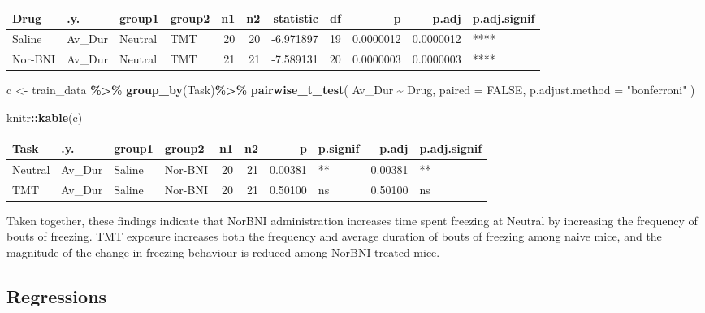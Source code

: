 \documentclass[
]{book}
\newenvironment{Shaded}{\begin{snugshade}}{\end{snugshade}}
\newcommand{\AttributeTok}[1]{\textcolor[rgb]{0.13,0.29,0.53}{#1}}
\newcommand{\ConstantTok}[1]{\textcolor[rgb]{0.56,0.35,0.01}{#1}}
\newcommand{\FunctionTok}[1]{\textcolor[rgb]{0.13,0.29,0.53}{\textbf{#1}}}
\newcommand{\NormalTok}[1]{#1}
\newcommand{\OtherTok}[1]{\textcolor[rgb]{0.56,0.35,0.01}{#1}}
\newcommand{\SpecialCharTok}[1]{\textcolor[rgb]{0.81,0.36,0.00}{\textbf{#1}}}
\newcommand{\StringTok}[1]{\textcolor[rgb]{0.31,0.60,0.02}{#1}}
\begin{document}
\begin{tabular}{l|l|l|l|r|r|r|r|r|r|l}
\hline
Drug & .y. & group1 & group2 & n1 & n2 & statistic & df & p & p.adj & p.adj.signif\\
\hline
Saline & Av\_Dur & Neutral & TMT & 20 & 20 & -6.971897 & 19 & 0.0000012 & 0.0000012 & ****\\
\hline
Nor-BNI & Av\_Dur & Neutral & TMT & 21 & 21 & -7.589131 & 20 & 0.0000003 & 0.0000003 & ****\\
\hline
\end{tabular}

\begin{Shaded}
\begin{Highlighting}[]
\NormalTok{c }\OtherTok{\textless{}{-}}\NormalTok{ train\_data }\SpecialCharTok{\%\textgreater{}\%}
  \FunctionTok{group\_by}\NormalTok{(Task)}\SpecialCharTok{\%\textgreater{}\%}
  \FunctionTok{pairwise\_t\_test}\NormalTok{(}
\NormalTok{  Av\_Dur }\SpecialCharTok{\textasciitilde{}}\NormalTok{ Drug, }\AttributeTok{paired =} \ConstantTok{FALSE}\NormalTok{,}
  \AttributeTok{p.adjust.method =} \StringTok{"bonferroni"}
\NormalTok{  )}

\NormalTok{knitr}\SpecialCharTok{::}\FunctionTok{kable}\NormalTok{(c)}
\end{Highlighting}
\end{Shaded}

\begin{tabular}{l|l|l|l|r|r|r|l|r|l}
\hline
Task & .y. & group1 & group2 & n1 & n2 & p & p.signif & p.adj & p.adj.signif\\
\hline
Neutral & Av\_Dur & Saline & Nor-BNI & 20 & 21 & 0.00381 & ** & 0.00381 & **\\
\hline
TMT & Av\_Dur & Saline & Nor-BNI & 20 & 21 & 0.50100 & ns & 0.50100 & ns\\
\hline
\end{tabular}

Taken together, these findings indicate that NorBNI administration increases time spent freezing at Neutral by increasing the frequency of bouts of freezing. TMT exposure increases both the frequency and average duration of bouts of freezing among naive mice, and the magnitude of the change in freezing behaviour is reduced among NorBNI treated mice.

\hypertarget{regressions}{%
\subsection{Regressions}\label{regressions}}
\end{document}
